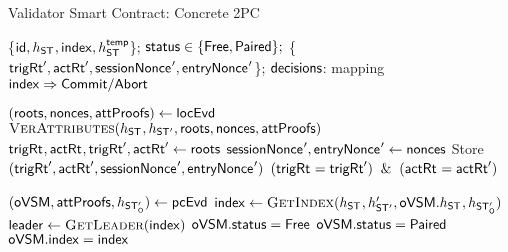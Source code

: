 

\begin{algorithm}[H]
    \small
    \caption{Validator Smart Contract: Concrete 2PC}
    \label{alg:vsm-trustless-p1}
    \begin{algorithmic}[1] %

        \Variables
            \State \{$\mathsf{id}, h_{\mathsf{ST_{}}}, \mathsf{index}, h_{\mathsf{ST_{}}}^{\mathsf{temp}} $\}; $\mathsf{status} \in \{\mathsf{Free}, \mathsf{Paired} \};$
            \State \{$\mathsf{trigRt}_{\mathsf{}}', \mathsf{actRt}_{\mathsf{}}', \mathsf{sessionNonce_{}}', \mathsf{entryNonce_{}}'$\};
            \State $\mathsf{decisions}$: mapping $\mathsf{index} \Rightarrow \mathsf{Commit}/\mathsf{Abort}$
        \EndVariables
        
        \Statex
            \State $(\mathsf{roots}, \mathsf{nonces}, \mathsf{attProofs}) \gets \mathsf{locEvd}$
            \State $\textproc{VerAttributes}(\dst{}, \dstt{}, \roots, \nonces, \attproofs)$
            \State $\mathsf{trigRt}_{\mathsf{}}, \mathsf{actRt}_{\mathsf{}},  \mathsf{trigRt}_{\mathsf{}}', \mathsf{actRt}_{\mathsf{}}' \gets \mathsf{roots}$
            \State $\mathsf{sessionNonce_{}}', \mathsf{entryNonce_{}}' \gets \mathsf{nonces}$
            \State Store $(\mathsf{trigRt}_{\mathsf{}}', \mathsf{actRt}_{\mathsf{}}', \mathsf{sessionNonce_{}}', \mathsf{entryNonce_{}}')$
            \State \Return $(\troot{} = \troot{}') \And (\aroot{} = \aroot{}')$
        \EndFunction
        
        \Statex
            \State $(\mathsf{oVSM}, \mathsf{attProofs}, h_{\mathsf{ST_{O}'}}) \gets \mathsf{pcEvd}$
            \State {}
            \State $\idx \gets \Call{GetIndex}{\dst{}, \dstt{}', \ovsm.\dst{}, \dstt{O}}$
            \State $\leader \gets \Call{GetLeader}{\idx}$
            \If{$\leader = \vsmid$} \; \require $\mathsf{oVSM}.\mathsf{status} = \mathsf{Free} $
            \Else
                \State \require $\mathsf{oVSM}.\mathsf{status} = \mathsf{Paired} $ 
                \State \require $\mathsf{oVSM}.\mathsf{index} = \mathsf{index}$
            \EndIf
            
        \EndFunction    

        \Statex


\end{algorithmic}
\end{algorithm}
